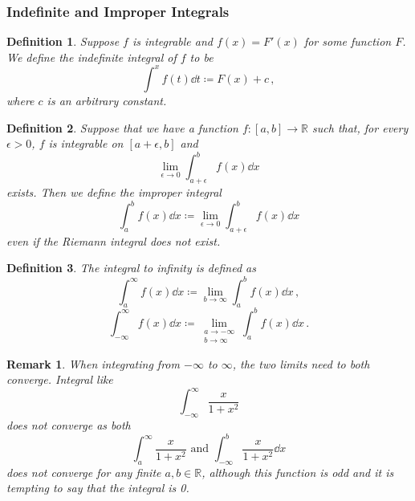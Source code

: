 \documentclass{article}
\theoremstyle{plain}\theoremheaderfont{\normalfont\itshape}\theorembodyfont{\rmfamily}\theoremseparator{.}\newtheorem*{rem}{Remark}\newtheorem*{ex}{Example}\newtheorem*{proof}{Proof}\newtheorem*{altp}{Alternative proof}
\theoremstyle{plain}\theoremheaderfont{\normalfont\bfseries}\theorembodyfont{\rmfamily}\theoremseparator{.}\newtheorem{thm}{Theorem}[section]\newtheorem{lem}[thm]{Lemma}\newtheorem{prop}[thm]{Proposition}\newtheorem*{cor}{Corollary}\newtheorem{defn}[thm]{Definition}\newtheorem{clm}[thm]{Claim}\newtheorem{clminproof}{Claim}
\theoremstyle{break}\theoremheaderfont{\normalfont\itshape}\theorembodyfont{\rmfamily}\theoremseparator{.\medskip}\newtheorem*{proofskip}{Proof}\newtheorem*{exs}{Examples}\newtheorem*{rems}{Remarks}
\theoremstyle{break}\theoremheaderfont{\normalfont\bfseries}\theorembodyfont{\rmfamily}\theoremseparator{.\medskip}\newtheorem{lemskip}[thm]{Lemma}\newtheorem{defnskip}[thm]{Definition}\newtheorem{propskip}[thm]{Proposition}\newtheorem{thmskip}[thm]{Theorem}
\numberwithin{equation}{section}
\begin{document}
	\subsubsection{Indefinite and Improper Integrals}
	\begin{defn}
		Suppose \(f\) is integrable and \(f(x)=F'(x)\) for some function \(F\). We define the \textit{indefinite integral} of \(f\) to be
		\[\int^{x}f(t)\dd{t}\coloneqq F(x)+c\,,\]
		where \(c\) is an arbitrary constant.
	\end{defn}
	\begin{defn}
		Suppose that we have a function \(f:[a,b]\to\mathbb{R}\) such that, for every \(\epsilon>0\), \(f\) is integrable on \([a+\epsilon,b]\) and
		\[\lim_{\epsilon\to 0}\int_{a+\epsilon}^{b}f(x)\dd{x}\]
		exists. Then we define the improper integral
		\[\int_a^b f(x)\dd{x}\coloneqq\lim_{\epsilon\to 0}\int_{a+\epsilon}^bf(x)\dd{x}\]
		even if the Riemann integral does not exist.
	\end{defn}
	\begin{defn}
		The integral to infinity is defined as
		\[\int_a^\infty f(x)\dd{x}\coloneqq\lim_{b\to\infty}\int_a^b f(x)\dd{x}\,,\]
		\[\int_{-\infty}^\infty f(x)\dd{x}\coloneqq\lim_{\substack{a\to -\infty\\b\to\infty}}\int_a^b f(x)\dd{x}\,.\]
	\end{defn}
	\begin{rem}
		When integrating from \(-\infty\) to \(\infty\), the two limits need to both converge. Integral like
		\[\int_{-\infty}^{\infty}\frac{x}{1+x^2}\]
		does not converge as both
		\[\int_{a}^{\infty}\frac{x}{1+x^2}\text{ and }\int_{-\infty}^{b}\frac{x}{1+x^2}\dd{x}\]
		does not converge for any finite \(a,b\in\mathbb{R}\), although this function is odd and it is tempting to say that the integral is 0.
	\end{rem}
\end{document}
